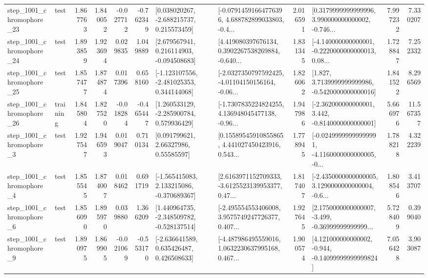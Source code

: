 \begin{tabular}{llrrrrllrlrr}
 step\_1001\_chromophore\_23 &      test &      1.867763 &    1.840052 &     -0.027712 & -0.762349 &    [0.038020267, -2.688215737, 0.215573459] &  [-0.07914591664776396, 4.688782899033803, -0.4... &       2.016591 &  [0.3179999999999996, 3.990000000000002, -0.746... &            7.997232 &          7.330207 \\
 step\_1001\_chromophore\_24 &      test &      1.893859 &    1.923694 &      0.029835 &  1.049889 &    [2.679567941, 0.216114903, -0.094508683] &  [4.419080397676134, 0.3902267538269884, -0.640... &       1.831345 &  [-4.140000000000001, -0.2220000000000013, 0.08... &            1.728847 &          7.252332 \\
 step\_1001\_chromophore\_25 &      test &      1.857477 &    1.874874 &      0.017396 &  0.658160 &   [-1.123107556, -2.481025353, 0.344144068] &  [-2.0327350797592425, -4.01104150156164, -0.06... &       1.826062 &   [1.827, 3.7139999999999986, -0.5420000000000016] &            1.841522 &          8.296569 \\
 step\_1001\_chromophore\_26 &  training &      1.845804 &    1.827520 &     -0.018284 & -0.465447 &    [1.260533129, -2.285900784, 0.579936429] &  [-1.7307835224824255, 4.136948045477138, -0.96... &       1.947986 &   [-2.362000000000001, 3.442, -0.8140000000000001] &            5.666976 &         11.567357 \\
  step\_1001\_chromophore\_3 &      test &      1.927547 &    1.946593 &      0.019047 &  0.710134 &       [0.091799621, 2.66327986, 0.55585597] &  [0.15589545910855865, 4.441027450423916, 0.543... &       1.778945 &  [-0.02499999999999991, -4.1160000000000005, -0... &            1.788218 &          4.322239 \\
  step\_1001\_chromophore\_4 &      test &      1.855545 &    1.874007 &      0.018462 &  0.691719 &   [-1.565415083, 2.133215086, -0.370689367] &  [2.6163971152709333, -3.6125523139953377, 0.47... &       1.817407 &  [-2.4350000000000005, 3.1290000000000004, -0.6... &            1.808546 &          3.413707 \\
  step\_1001\_chromophore\_6 &      test &      1.856090 &    1.895970 &      0.039880 &  1.366209 &   [1.440964735, -2.348509782, -0.528137514] &  [-2.495554553406008, 3.9575749247726377, 0.407... &       1.927645 &  [2.1750000000000007, -3.499, -0.36999999999999... &            5.728409 &          0.399040 \\
  step\_1001\_chromophore\_9 &      test &      1.890975 &    1.869905 &     -0.021069 & -0.553170 &    [-2.636641589, 0.635426487, 0.426508633] &  [-4.487986495559016, 1.0632230637995168, 0.467... &       1.900574 &  [4.121000000000002, -0.944, -0.14099999999999824] &            7.056428 &          3.903087 \\

\end{tabular}
